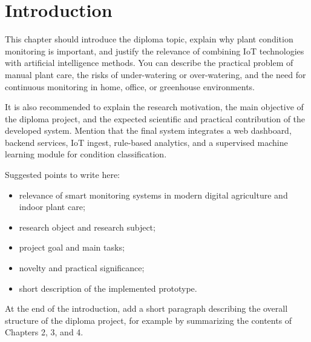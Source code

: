 \chapter{Introduction}

This chapter should introduce the diploma topic, explain why plant condition monitoring is important, and justify the relevance of combining IoT technologies with artificial intelligence methods. You can describe the practical problem of manual plant care, the risks of under-watering or over-watering, and the need for continuous monitoring in home, office, or greenhouse environments.

It is also recommended to explain the research motivation, the main objective of the diploma project, and the expected scientific and practical contribution of the developed system. Mention that the final system integrates a web dashboard, backend services, IoT ingest, rule-based analytics, and a supervised machine learning module for condition classification.

Suggested points to write here:
\begin{itemize}
    \item relevance of smart monitoring systems in modern digital agriculture and indoor plant care;
    \item research object and research subject;
    \item project goal and main tasks;
    \item novelty and practical significance;
    \item short description of the implemented prototype.
\end{itemize}

At the end of the introduction, add a short paragraph describing the overall structure of the diploma project, for example by summarizing the contents of Chapters 2, 3, and 4.
